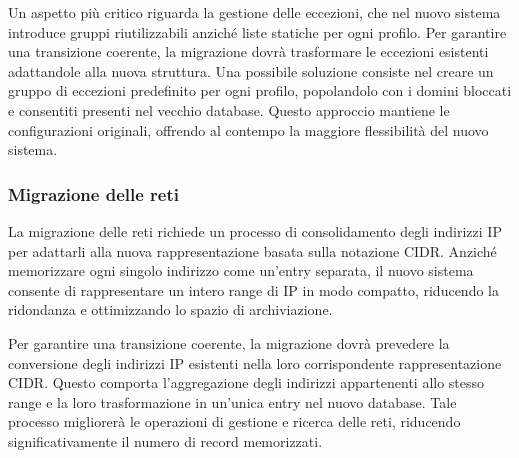Un aspetto più critico riguarda la gestione delle eccezioni, che nel nuovo sistema introduce gruppi riutilizzabili anziché liste statiche per ogni profilo. Per garantire una transizione coerente, la migrazione dovrà trasformare le eccezioni esistenti adattandole alla nuova struttura. Una possibile soluzione consiste nel creare un gruppo di eccezioni predefinito per ogni profilo, popolandolo con i domini bloccati e consentiti presenti nel vecchio database. Questo approccio mantiene le configurazioni originali, offrendo al contempo la maggiore flessibilità del nuovo sistema.

\subsubsection{Migrazione delle reti}
La migrazione delle reti richiede un processo di consolidamento degli indirizzi IP per adattarli alla nuova rappresentazione basata sulla notazione CIDR. Anziché memorizzare ogni singolo indirizzo come un’entry separata, il nuovo sistema consente di rappresentare un intero range di IP in modo compatto, riducendo la ridondanza e ottimizzando lo spazio di archiviazione.

Per garantire una transizione coerente, la migrazione dovrà prevedere la conversione degli indirizzi IP esistenti nella loro corrispondente rappresentazione CIDR. Questo comporta l’aggregazione degli indirizzi appartenenti allo stesso range e la loro trasformazione in un’unica entry nel nuovo database. Tale processo migliorerà le operazioni di gestione e ricerca delle reti, riducendo significativamente il numero di record memorizzati.
